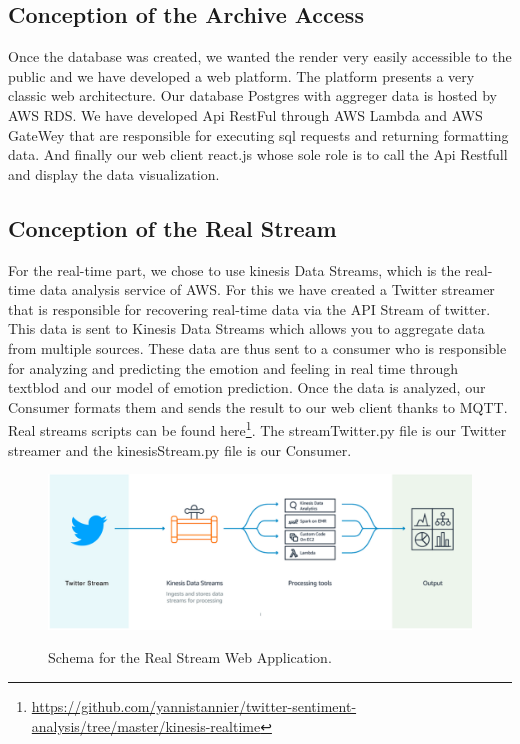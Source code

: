 \documentclass{acmtog} %
\begin{document}
\begin{itemize}
\subsection{Conception of the Archive Access}
\label{subsub:conception_aa}

Once the database was created, we wanted the render very easily accessible to the public and we have developed a web platform.
The platform presents a very classic web architecture. Our database Postgres with aggreger data is hosted by AWS RDS.
We have developed Api RestFul through AWS Lambda and AWS GateWey that are responsible for executing sql requests and returning formatting data.
And finally our web client react.js whose sole role is to call the Api Restfull and display the data visualization.

\subsection{Conception of the Real Stream}
\label{subsub:conception_rs}

For the real-time part, we chose to use kinesis Data Streams, which is the real-time data analysis service of AWS.
For this we have created a Twitter streamer that is responsible for recovering real-time data via the API Stream of twitter. This data is sent to Kinesis Data Streams which allows you to aggregate data from multiple sources.
These data are thus sent to a consumer who is responsible for analyzing and predicting the emotion and feeling in real time through textblod and our model of emotion prediction.
Once the data is analyzed, our Consumer formats them and sends the result to our web client thanks to MQTT.
Real streams scripts can be found here\footnote{\url{https://github.com/yannistannier/twitter-sentiment-analysis/tree/master/kinesis-realtime}}.
The streamTwitter.py file is our Twitter streamer and the kinesisStream.py file is our Consumer.


\begin{figure}[H]
{\includegraphics[width=\linewidth]{real_stream-schema.png}}
\caption{Schema for the Real Stream Web Application.}
  \label{fig:archivers}
\end{figure}



\end{itemize}
\end{document}
